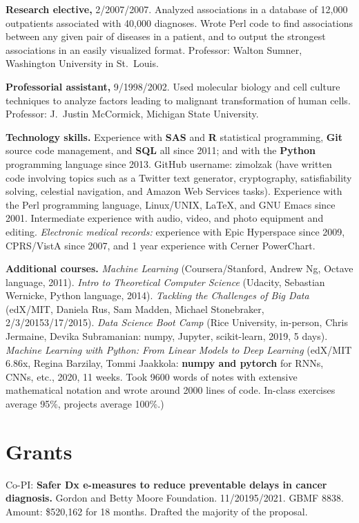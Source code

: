 \documentclass[10pt]{article}
\begin{document}
\textbf{Research elective,} 2/2007/2007. Analyzed associations
in a database of 12,000 outpatients associated with 40,000 diagnoses.
Wrote Perl code to find associations between any given pair of
diseases in a patient, and to output the strongest associations in an
easily visualized format. Professor: Walton Sumner, Washington
University in St.\ Louis.

\textbf{Professorial assistant,} 9/1998/2002. Used molecular
biology and cell culture techniques to analyze factors leading to
malignant transformation of human cells. Professor: J.\ Justin
McCormick, Michigan State University.

\textbf{Technology skills.} Experience with \textbf{SAS} and \textbf{R} statistical
programming, \textbf{Git} source code management, and \textbf{SQL} all since 2011; and
with the \textbf{Python} programming language since 2013. GitHub username:
zimolzak (have written code involving topics such as a Twitter text
generator, cryptography, satisfiability solving, celestial navigation,
and Amazon Web Services tasks). Experience with the Perl programming
language, Linux/UNIX, \LaTeX, and GNU Emacs since 2001. Intermediate
experience with audio, video, and photo equipment and editing.
\emph{Electronic medical records:} experience with Epic Hyperspace
since 2009, CPRS/VistA since 2007, and 1 year experience with Cerner
PowerChart.

\textbf{Additional courses.} \emph{Machine Learning}
(Coursera/Stanford, Andrew Ng, Octave language, 2011). \emph{Intro to
  Theoretical Computer Science} (Udacity, Sebastian Wernicke, Python
language, 2014). \emph{Tackling the Challenges of Big Data} (edX/MIT,
Daniela Rus, Sam Madden, Michael Stonebraker,
2/3/2015\ndash{}3/17/2015). \emph{Data Science Boot Camp} (Rice
University, in-person, Chris Jermaine, Devika Subramanian: numpy,
Jupyter, scikit-learn, 2019, 5 days). \emph{Machine Learning with
  Python: From Linear Models to Deep Learning} (edX/MIT 6.86x, Regina
Barzilay, Tommi Jaakkola: \textbf{numpy and pytorch} for RNNs, CNNs, etc.,
2020, 11 weeks. Took 9600 words of notes with extensive mathematical
notation and wrote around 2000 lines of code. In-class exercises
average 95\%, projects average 100\%.)




\section*{Grants}

Co-PI: \textbf{Safer Dx e-measures to reduce preventable delays in
  cancer diagnosis.} Gordon and Betty Moore Foundation.
11/2019\ndash{}5/2021. GBMF 8838. Amount: \$520,162 for 18 months.
Drafted the majority of the proposal.
\end{document}
